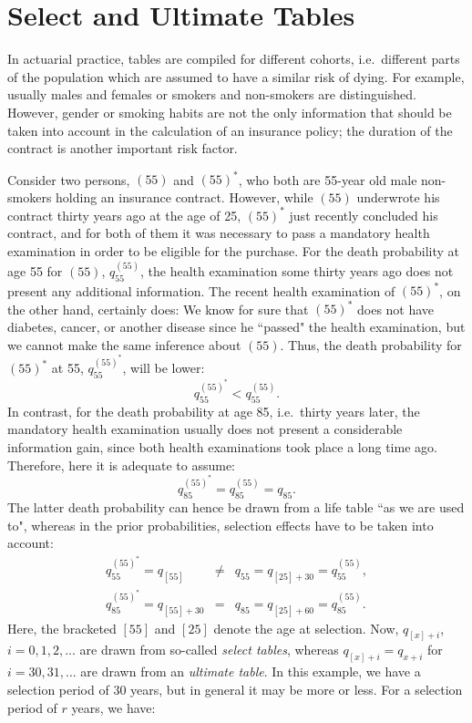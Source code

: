 \documentclass[11pt,fleqn,oneside]{book}
\begin{document}
\section{Select and Ultimate Tables}
\label{SECSELULTTABS}
 
 In actuarial practice, tables are compiled for different cohorts, i.e.\ different parts of the population which are assumed to have a similar risk of dying. For example, usually males and females or smokers and non-smokers are distinguished. However, gender or smoking habits are not the only information that should be taken into account in the calculation of an insurance policy; the duration of the contract is another important risk factor.
 
Consider two persons, $(55)$ and $(55)^*$, who both are 55-year old male non-smokers holding an insurance contract. However, while $(55)$ underwrote his contract thirty years ago at the age of 25, $(55)^*$ just recently concluded his contract, and for both of them it was necessary to pass a mandatory health examination in order to be eligible for the purchase. For the death probability at age 55 for $(55)$, $q_{55}^{(55)}$, the health examination some thirty years ago does not present any additional information. The recent health examination of $(55)^*$, on the other hand, certainly does: We know for sure that $(55)^*$ does not have diabetes, cancer, or another disease since he ``passed" the health examination, but we cannot make the same inference about $(55)$. Thus, the death probability for $(55)^*$ at 55, $q_{55}^{(55)^*}$, will be lower:
$$
{q_{55}^{(55)^*}} < {q_{55}^{(55)}}.
$$
In contrast, for the death probability at age 85, i.e.\ thirty years later, the mandatory health examination usually does  not present a considerable information gain, since both health examinations took place a long time ago. Therefore, here it is adequate to assume:
$$
{q_{85}^{(55)^*}} = {q_{85}^{(55)}} = {q_{85}}.
$$
The latter death probability can hence be drawn from a life table ``as we are used to", whereas in the prior probabilities, selection effects have to be taken into account:
\begin{eqnarray*}
{q_{55}^{(55)^*}} = q_{[55]} &\neq& q_{55} = q_{[25]+30} =   {q_{55}^{(55)}},\\
{q_{85}^{(55)^*}} = q_{[55]+30} &=& q_{85} = q_{[25]+60} =   {q_{85}^{(55)}}.
\end{eqnarray*}
Here, the bracketed $[55]$ and $[25]$ denote the age at selection. Now, $q_{[x]+i}$, $i=0,1,2,...$ are drawn from so-called \textit{select tables}, whereas $q_{[x]+i} = q_{x+i}$ for $i=30,31,...$ are drawn from an \textit{ultimate table}. In this example, we have a selection period of $30$ years, but in general it may be more or less. For a selection period of $r$ years, we have:
\end{document}
